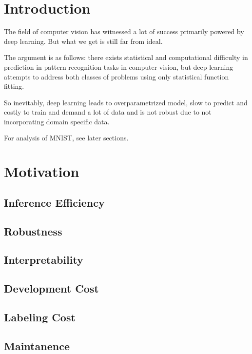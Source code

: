 \documentclass[11pt]{article} 	%
\theoremstyle{definition}
\begin{document}
\tableofcontents

\clearpage


\section{Introduction}

The field of computer vision has witnessed a lot of success primarily powered by deep learning. But what we get is still far from ideal.

The argument is as follows: there exists statistical and computational difficulty in prediction in pattern recognition tasks in computer vision, but deep learning attempts to address both classes of problems using only statistical function fitting.


So inevitably, deep learning leads to overparametrized model, slow to predict and costly to train and demand a lot of data and is not robust due to not incorporating domain specific data.

For analysis of MNIST, see later sections.

\section{Motivation}

\subsection{Inference Efficiency}

\subsection{Robustness}

\subsection{Interpretability}

\subsection{Development Cost}

\subsection{Labeling Cost}

\subsection{Maintanence}
\end{document}
